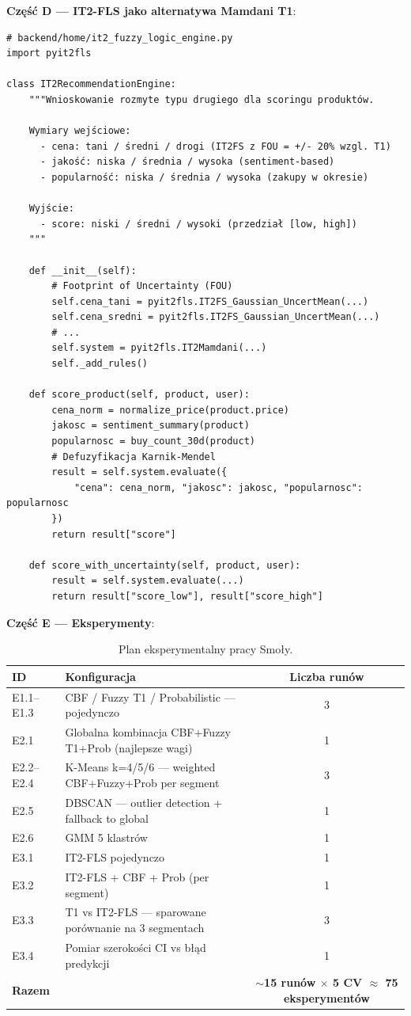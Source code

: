 \documentclass[a4paper,11pt]{article}
\begin{document}
\textbf{Część D --- IT2-FLS jako alternatywa Mamdani T1}:

\begin{lstlisting}
# backend/home/it2_fuzzy_logic_engine.py
import pyit2fls

class IT2RecommendationEngine:
    """Wnioskowanie rozmyte typu drugiego dla scoringu produktów.

    Wymiary wejściowe:
      - cena: tani / średni / drogi (IT2FS z FOU = +/- 20% wzgl. T1)
      - jakość: niska / średnia / wysoka (sentiment-based)
      - popularność: niska / średnia / wysoka (zakupy w okresie)

    Wyjście:
      - score: niski / średni / wysoki (przedział [low, high])
    """

    def __init__(self):
        # Footprint of Uncertainty (FOU)
        self.cena_tani = pyit2fls.IT2FS_Gaussian_UncertMean(...)
        self.cena_sredni = pyit2fls.IT2FS_Gaussian_UncertMean(...)
        # ...
        self.system = pyit2fls.IT2Mamdani(...)
        self._add_rules()

    def score_product(self, product, user):
        cena_norm = normalize_price(product.price)
        jakosc = sentiment_summary(product)
        popularnosc = buy_count_30d(product)
        # Defuzyfikacja Karnik-Mendel
        result = self.system.evaluate({
            "cena": cena_norm, "jakosc": jakosc, "popularnosc": popularnosc
        })
        return result["score"]

    def score_with_uncertainty(self, product, user):
        result = self.system.evaluate(...)
        return result["score_low"], result["score_high"]
\end{lstlisting}

\textbf{Część E --- Eksperymenty}:

\begin{table}[H]
\centering
\small
\begin{tabularx}{\textwidth}{l Y c}
\toprule
\textbf{ID} & \textbf{Konfiguracja} & \textbf{Liczba runów} \\
\midrule
E1.1--E1.3 & CBF / Fuzzy T1 / Probabilistic --- pojedynczo & 3 \\
E2.1 & Globalna kombinacja CBF+Fuzzy T1+Prob (najlepsze wagi) & 1 \\
E2.2--E2.4 & K-Means k=4/5/6 --- weighted CBF+Fuzzy+Prob per segment & 3 \\
E2.5 & DBSCAN --- outlier detection + fallback to global & 1 \\
E2.6 & GMM 5 klastrów & 1 \\
E3.1 & IT2-FLS pojedynczo & 1 \\
E3.2 & IT2-FLS + CBF + Prob (per segment) & 1 \\
E3.3 & T1 vs IT2-FLS --- sparowane porównanie na 3 segmentach & 3 \\
E3.4 & Pomiar szerokości CI vs błąd predykcji & 1 \\
\midrule
\textbf{Razem} & & \textbf{$\sim$15 runów $\times$ 5 CV $\approx$ 75 eksperymentów} \\
\bottomrule
\end{tabularx}
\caption{Plan eksperymentalny pracy Smoły.}
\end{table}
\end{document}
